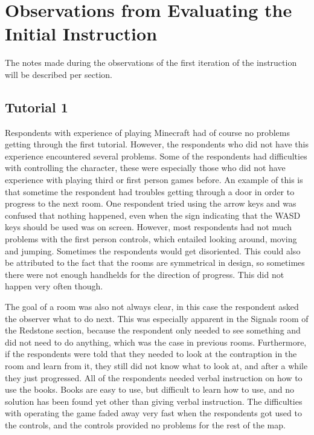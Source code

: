 \documentclass[11pt,twoside]{report} %
\begin{document}
\section{Observations from Evaluating the Initial Instruction}

The notes made during the observations of the first iteration of the instruction will be described per section.

\subsection{Tutorial 1}

Respondents with experience of playing Minecraft had of course no problems getting through the first tutorial. However, the respondents who did not have this experience encountered several problems. Some of the respondents had difficulties with controlling the character, these were especially those who did not have experience with playing third or first person games before. An example of this is that sometime the respondent had troubles getting through a door in order to progress to the next room. One respondent tried using the arrow keys and was confused that nothing happened, even when the sign indicating that the WASD keys should be used was on screen. However, most respondents had not much problems with the first person controls, which entailed looking around, moving and jumping. Sometimes the respondents would get disoriented. This could also be attributed to the fact that the rooms are symmetrical in design, so sometimes there were not enough handhelds for the direction of progress. This did not happen very often though.

The goal of a room was also not always clear, in this case the respondent asked the observer what to do next. This was especially apparent in the Signals room of the Redstone section, because the respondent only needed to see something and did not need to do anything, which was the case in previous rooms. Furthermore, if the respondents were told that they needed to look at the contraption in the room and learn from it, they still did not know what to look at, and after a while they just progressed. All of the respondents needed verbal instruction on how to use the books. Books are easy to use, but difficult to learn how to use, and no solution has been found yet other than giving verbal instruction. The difficulties with operating the game faded away very fast when the respondents got used to the controls, and the controls provided no problems for the rest of the map.
\end{document}
